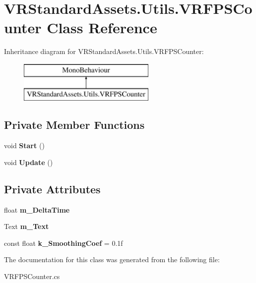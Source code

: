 \hypertarget{class_v_r_standard_assets_1_1_utils_1_1_v_r_f_p_s_counter}{}\section{V\+R\+Standard\+Assets.\+Utils.\+V\+R\+F\+P\+S\+Counter Class Reference}
\label{class_v_r_standard_assets_1_1_utils_1_1_v_r_f_p_s_counter}
Inheritance diagram for V\+R\+Standard\+Assets.\+Utils.\+V\+R\+F\+P\+S\+Counter\+:\begin{figure}[H]
\begin{center}
\leavevmode
\includegraphics[height=2.000000cm]{class_v_r_standard_assets_1_1_utils_1_1_v_r_f_p_s_counter}
\end{center}
\end{figure}
\subsection*{Private Member Functions}
\begin{DoxyCompactItemize}
\item 
\mbox{\label{class_v_r_standard_assets_1_1_utils_1_1_v_r_f_p_s_counter_a84a0de45e2e871f1228b378aedcc9042}} 
void {\bfseries Start} ()
\item 
\mbox{\label{class_v_r_standard_assets_1_1_utils_1_1_v_r_f_p_s_counter_aa547aee82ad5a96479f40fb49418611b}} 
void {\bfseries Update} ()
\end{DoxyCompactItemize}
\subsection*{Private Attributes}
\begin{DoxyCompactItemize}
\item 
\mbox{\label{class_v_r_standard_assets_1_1_utils_1_1_v_r_f_p_s_counter_a164038f6f2b9c2c7ecce3f1b12c853de}} 
float {\bfseries m\+\_\+\+Delta\+Time}
\item 
\mbox{\label{class_v_r_standard_assets_1_1_utils_1_1_v_r_f_p_s_counter_ac357e3507744a006ad0bad77e05027e6}} 
Text {\bfseries m\+\_\+\+Text}
\item 
\mbox{\label{class_v_r_standard_assets_1_1_utils_1_1_v_r_f_p_s_counter_a5d338da1157e4c589f7a21c6cdf7c95c}} 
const float {\bfseries k\+\_\+\+Smoothing\+Coef} = 0.\+1f
\end{DoxyCompactItemize}


The documentation for this class was generated from the following file\+:\begin{DoxyCompactItemize}
\item 
V\+R\+F\+P\+S\+Counter.\+cs\end{DoxyCompactItemize}
